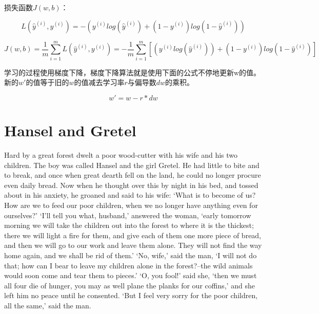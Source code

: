 \documentclass[oneside,10pt]{memoir} %
\begin{document}
损失函数$J(w,b)$：

\begin{equation}
    L(\hat{y}^{(i)},y^{(i)}) = -(y^{(i)}log(\hat{y}^{(i)})+(1-y^{(i)})log(1-\hat{y}^{(i)}))
\end{equation}

\begin{equation}
    J(w,b) =  \frac{1}{m} \sum_{i = 1}^{m}  L(\hat{y}^{(i)},y^{(i)}) =-\frac{1}{m} \sum_{i = 1}^{m} [ (y^{(i)}log(\hat{y}^{(i)}))+(1-y^{(i)})log(1-\hat{y}^{(i)}) ]
\end{equation}

学习的过程使用梯度下降，梯度下降算法就是使用下面的公式不停地更新w的值。新的$w'$的值等于旧的$w$的值减去学习率$r$与偏导数$dw$的乘积。

\begin{equation}
    w' = w - r*dw
\end{equation}


\chapter{Hansel and Gretel}

Hard by a great forest dwelt a poor wood-cutter with his wife and his two children. The boy was called Hansel and the girl Gretel. He had little to bite and to break, and once when great dearth fell on the land, he could no longer procure even daily bread. Now when he thought over this by night in his bed, and tossed about in his anxiety, he groaned and said to his wife: `What is to become of us? How are we to feed our poor children, when we no longer have anything even for ourselves?' `I'll tell you what, husband,' answered the woman, `early tomorrow morning we will take the children out into the forest to where it is the thickest; there we will light a fire for them, and give each of them one more piece of bread, and then we will go to our work and leave them alone. They will not find the way home again, and we shall be rid of them.' `No, wife,' said the man, `I will not do that; how can I bear to leave my children alone in the forest?--the wild animals would soon come and tear them to pieces.' `O, you fool!' said she, `then we must all four die of hunger, you may as well plane the planks for our coffins,' and she left him no peace until he consented. `But I feel very sorry for the poor children, all the same,' said the man.
\end{document}

